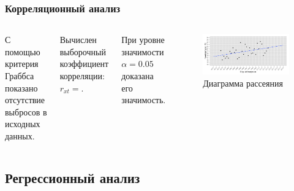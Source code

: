 \documentclass[10pt,pdf,aspectratio=169,hyperref={unicode}]{beamer}
\newcommand{\inp}[1]{}
\newcommand{\characteristic}[2]{\inp{#1/characteristics/#2}}
\begin{document}
\begin{frame}
  \frametitle{Корреляционный анализ}
  \begin{columns}[c]
  \column{2in}
  С помощью критерия Граббса показано отсутствие выбросов в исходных данных.

  \vspace{0.5em}

  Вычислен выборочный коэффициент корреляции: $ r_{xt} = \characteristic{original}{correlation} $.

  \vspace{0.5em}

  При уровне значимости $ \alpha=0.05 $ доказана его значимость.
  \column{4in}
    \begin{figure}[h]
    \includegraphics[width=1\linewidth]{../../figures/original/scatterplot.png}
    \caption{Диаграмма рассеяния}
  \end{figure}
  \end{columns}
\end{frame}

\subsection{Регрессионный анализ}
\end{document}
